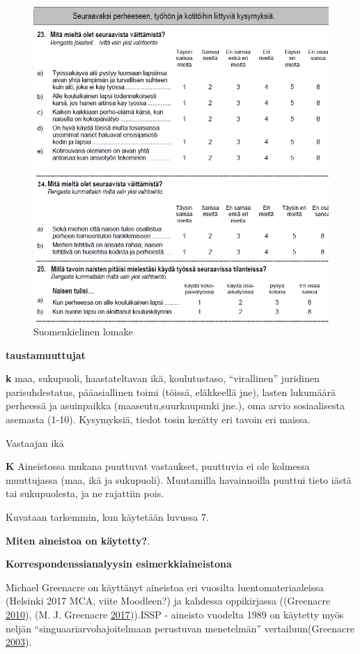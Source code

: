 \documentclass[
  finnish,
]{book}
\begin{document}
\begin{figure}

{\centering \includegraphics[width=0.5\linewidth]{img/substvar_fi_Q1Q2} 

}

\caption{Suomenkielinen lomake}\label{fig:suom-kys}
\end{figure}

\textbf{taustamuuttujat}

\textbf{k} maa, sukupuoli, haastateltavan ikä, koulutustaso,
``virallinen'' juridinen parisuhdestatus, pääasiallinen toimi (töissä,
eläkkeellä jne), lasten lukumäärä perheessä ja asuinpaikka
(maaseutu,suurkaupunki jne.), oma arvio sosiaalisesta asemasta (1-10).
Kysymyksiä, tiedot tosin kerätty eri tavoin eri maissa.

Vastaajan ikä

\textbf{K} Aineistossa mukana puuttuvat vastaukset, puuttuvia ei ole
kolmessa muuttujassa (maa, ikä ja sukupuoli). Muutamilla havainnoilla
puuttui tieto iästä tai sukupuolesta, ja ne rajattiin pois.

Kuvataan tarkemmin, kun käytetään luvussa 7.

\textbf{Miten aineistoa on käytetty?}.

\textbf{Korrespondenssianalyysin esimerkkiaineistona}

Michael Greenacre on käyttänyt aineistoa eri vuosilta
luentomateriaaleissa (Helsinki 2017 MCA, viite Moodleen?) ja kahdessa
oppikirjassa ((Greenacre
\protect\hyperlink{ref-RefWorks:doc:5a857a43e4b0ed2d44664d7c}{2010}),
(M. J. Greenacre
\protect\hyperlink{ref-RefWorks:doc:5a857a43e4b0ed2d44664d78}{2017})).ISSP
- aineisto vuodelta 1989 on käytetty myös neljän
``singuaariarvohajoitelmaan perustuvan menetelmän'' vertailuun(Greenacre
\protect\hyperlink{ref-RefWorks:doc:5b6f159ce4b0bc0f31734b76}{2003}).
\end{document}

